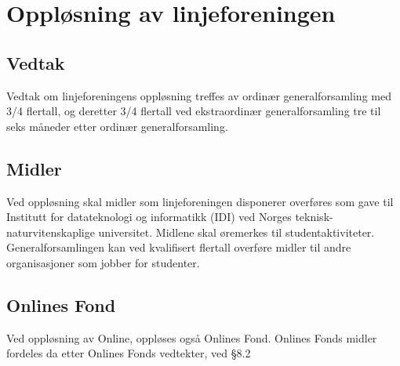 \chapter{Oppløsning av linjeforeningen}
\section{Vedtak}
\vspace{23pt}

Vedtak om linjeforeningens oppløsning treffes av ordinær generalforsamling med 3/4 flertall, og deretter 3/4 flertall ved ekstraordinær generalforsamling tre til seks måneder etter ordinær generalforsamling.

\section{Midler}
\vspace{23pt}

Ved oppløsning skal midler som linjeforeningen disponerer overføres som gave til \mbox{Institutt} for datateknologi og informatikk (IDI) ved Norges teknisk-\linebreak naturvitenskaplige universitet. Midlene skal øremerkes til studentaktiviteter. Generalforsamlingen kan ved kvalifisert flertall overføre midler til andre organisasjoner som jobber for studenter.

\section{Onlines Fond}
\vspace{23pt}

Ved oppløsning av Online, oppløses også Onlines Fond. Onlines Fonds midler fordeles da etter Onlines Fonds vedtekter, ved §8.2
